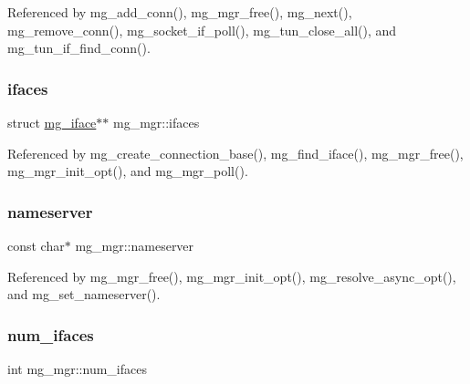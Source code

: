 Referenced by mg\+\_\+add\+\_\+conn(), mg\+\_\+mgr\+\_\+free(), mg\+\_\+next(), mg\+\_\+remove\+\_\+conn(), mg\+\_\+socket\+\_\+if\+\_\+poll(), mg\+\_\+tun\+\_\+close\+\_\+all(), and mg\+\_\+tun\+\_\+if\+\_\+find\+\_\+conn().

\mbox{\label{structmg__mgr_afd2b46e44b87ffc58a8e286ed784ee31_afd2b46e44b87ffc58a8e286ed784ee31}} 
\subsubsection{\texorpdfstring{ifaces}{ifaces}}
{\footnotesize\ttfamily struct \hyperlink{structmg__iface}{mg\+\_\+iface}$\ast$$\ast$ mg\+\_\+mgr\+::ifaces}



Referenced by mg\+\_\+create\+\_\+connection\+\_\+base(), mg\+\_\+find\+\_\+iface(), mg\+\_\+mgr\+\_\+free(), mg\+\_\+mgr\+\_\+init\+\_\+opt(), and mg\+\_\+mgr\+\_\+poll().

\mbox{\label{structmg__mgr_a6177e6c1145fe43e36d7cc926a7f0d8c_a6177e6c1145fe43e36d7cc926a7f0d8c}} 
\subsubsection{\texorpdfstring{nameserver}{nameserver}}
{\footnotesize\ttfamily const char$\ast$ mg\+\_\+mgr\+::nameserver}



Referenced by mg\+\_\+mgr\+\_\+free(), mg\+\_\+mgr\+\_\+init\+\_\+opt(), mg\+\_\+resolve\+\_\+async\+\_\+opt(), and mg\+\_\+set\+\_\+nameserver().

\mbox{\label{structmg__mgr_a5354db212e2db2b8e115017ecf1060df_a5354db212e2db2b8e115017ecf1060df}} 
\subsubsection{\texorpdfstring{num\+\_\+ifaces}{num\_ifaces}}
{\footnotesize\ttfamily int mg\+\_\+mgr\+::num\+\_\+ifaces}



